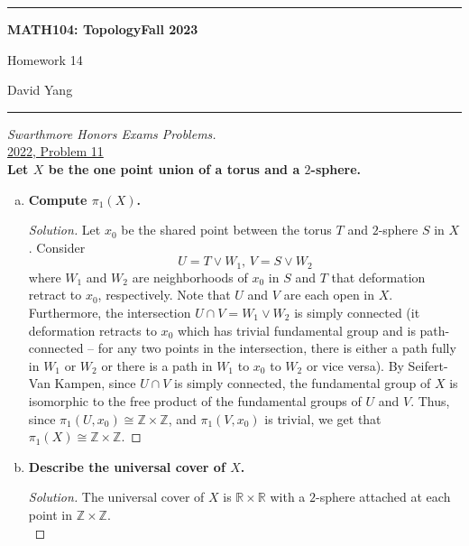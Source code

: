 \documentclass[11pt]{article}
\newcommand{\R}{\mathbb{R}}
\newcommand{\Z}{\mathbb{Z}}
\newenvironment{solution}
  {\renewcommand\qedsymbol{$\blacksquare$}\begin{proof}[Solution]}
  {\end{proof}}
\begin{document}
	\hrule
	\begin{center}
        \textbf{MATH104: Topology}\hfill \textbf{Fall 2023}\newline

		{\Large Homework 14}

		David Yang
	\end{center}

\hrule

\vspace{1em}

\textit{Swarthmore Honors Exams Problems.} \\

\underline{2022, Problem 11} \\

\textbf{Let $X$ be the one point union of a torus and a $2$-sphere.}
\begin{enumerate}[a)]
    \item \textbf{Compute $\pi_1(X)$.}
    
    \begin{solution} 
    Let $x_0$ be the shared point between the torus $T$ and $2$-sphere $S$ in $X$. Consider 
    \[
        U = T \vee W_1, \, V = S \vee W_2
    \]
    where $W_1$ and $W_2$ are neighborhoods of $x_0$ in $S$ and $T$ that deformation retract to $x_0$, respectively. 
    Note that $U$ and $V$ are each open in $X$. Furthermore, the intersection $U \cap V = W_1 \vee W_2$ is simply connected (it deformation retracts to $x_0$
    which has trivial fundamental group and is path-connected -- for any two points in the intersection, there is either a path fully in $W_1$ or $W_2$ or there is a path in $W_1$ to $x_0$ to $W_2$ or vice versa). 
    By Seifert-Van Kampen, since $U \cap V$ is simply connected,
    the fundamental group of $X$ is isomorphic to the free product of the fundamental groups of $U$ and $V$. Thus, since $\pi_1(U, x_0) \cong \Z \times \Z$, and $\pi_1(V, x_0)$ is trivial, we 
    get that $\boxed{\pi_1(X) \cong \Z \times \Z}$. 
    \end{solution}

    \item \textbf{Describe the universal cover of $X$.}
    \begin{solution}
    The universal cover of $X$ is $\R \times \R$ with a $2$-sphere attached at each point in $\Z \times \Z$. \\


\end{solution}
\end{enumerate}
\end{document}
